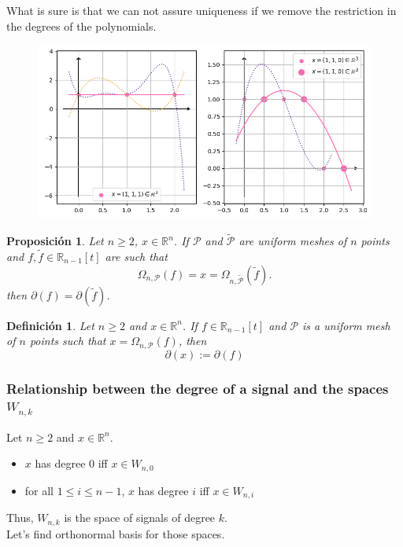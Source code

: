 \documentclass[]{beamer}
\newtheorem{prop}{\bf Proposición}
\newtheorem{defi}{\bf Definición}
\theoremstyle{definition}
\newcommand{\IR}{\mathbb{R}}
\newcommand{\cali}[1]{\mathcal{#1}} %
\begin{document}
\begin{frame}
What is sure is that we can not assure uniqueness if
we remove the restriction in the degrees of the polynomials. 
\begin{figure}[h]
\includegraphics[scale = 0.5]{25Nov_1}
\end{figure}
\end{frame}

\begin{frame}
\begin{prop}
Let $n \geq 2$, $x \in \IR^{n}$. If $\cali{P}$ and $\tilde{\cali{P}}$
are uniform meshes of $n$ points and $f, \tilde{f} \in \IR_{n-1}[t]$ 
are such that
\[
\Omega_{n, \cali{P}}(f) = x = \Omega_{n, \tilde{\cali{P}}}(\tilde{f}).
\]
then $\partial(f) = \partial(\tilde{f})$.
\end{prop}

\begin{defi}
Let $n \geq 2$ and $x \in \IR^{n}$. If $f \in \IR_{n-1}[t]$
and $\cali{P}$ is a uniform mesh of $n$ points such that
$x = \Omega_{n, \cali{P}}(f)$, then 
\[
\partial(x) := \partial(f)
\]
\end{defi}
\end{frame}


\begin{frame}
\frametitle{Relationship between the degree of a signal and the spaces $W_{n,k}$}
Let $n \geq 2$ and $x \in \IR^{n}$.
\begin{itemize}
\item $x$ has degree 0 iff $x \in W_{n,0}$
\item for all $1 \leq i \leq n-1$, $x$ has degree $i$ iff
$x \in W_{n,i}$
\end{itemize}

Thus, $W_{n,k}$ is the space of signals of degree $k$. \\
Let's find orthonormal basis for those spaces.

\end{frame}
\end{document}
